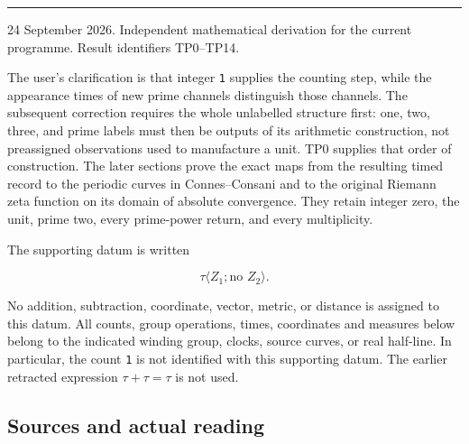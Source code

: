\documentclass[
]{article}
\begin{document}
\begin{center}\rule{0.5\linewidth}{0.5pt}\end{center}

24 September 2026. Independent mathematical derivation for the current
programme. Result identifiers TP0--TP14.

The user's clarification is that integer \texttt{1} supplies the
counting step, while the appearance times of new prime channels
distinguish those channels. The subsequent correction requires the whole
unlabelled structure first: one, two, three, and prime labels must then
be outputs of its arithmetic construction, not preassigned observations
used to manufacture a unit. TP0 supplies that order of construction. The
later sections prove the exact maps from the resulting timed record to
the periodic curves in Connes--Consani and to the original Riemann zeta
function on its domain of absolute convergence. They retain integer
zero, the unit, prime two, every prime-power return, and every
multiplicity.

The supporting datum is written

\[
\tau\langle Z_1;\text{no }Z_2\rangle.
\]

No addition, subtraction, coordinate, vector, metric, or distance is
assigned to this datum. All counts, group operations, times, coordinates
and measures below belong to the indicated winding group, clocks, source
curves, or real half-line. In particular, the count \texttt{1} is not
identified with this supporting datum. The earlier retracted expression
\(\tau+\tau=\tau\) is not used.

\subsection{Sources and actual
reading}\label{sources-and-actual-reading}
\end{document}
